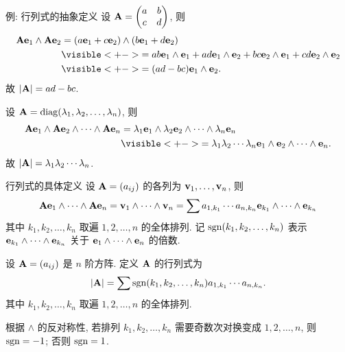 \begin{frame}{例: 行列式的抽象定义\noexer}
	\onslide<+->
	设 ${\mathbf{A}}=\begin{pmatrix}
		a&b\\c&d
	\end{pmatrix}$,
	\onslide<+->
	则
	\begin{align*}
		\bfA\bfe_1\wedge\bfA\bfe_2&=
		(a\bfe_1+c\bfe_2)\wedge(b\bfe_1+d\bfe_2)\\
		&\visible<+->{=ab\bfe_1\wedge\bfe_1+ad\bfe_1\wedge\bfe_2+bc\bfe_2\wedge\bfe_1+cd\bfe_2\wedge\bfe_2}\\
		&\visible<+->{=(ad-bc)\bfe_1\wedge\bfe_2.}
	\end{align*}
	\onslide<+->
	故 $|{\mathbf{A}}|=ad-bc$.

	\onslide<+->
	设 ${\mathbf{A}}={\mathrm{diag}}(\lambda_1,\lambda_2,\dots,\lambda_n)$,
	\onslide<+->
	则
	\begin{align*}
		\bfA\bfe_1\wedge\bfA\bfe_2\wedge\cdots\wedge\bfA\bfe_n
		&=\lambda_1\bfe_1\wedge\lambda_2\bfe_2\wedge \cdots\wedge\lambda_n\bfe_n\\
		&\visible<+->{=\lambda_1\lambda_2\cdots\lambda_n\bfe_1\wedge\bfe_2\wedge\cdots\wedge\bfe_n.}
	\end{align*}
	\onslide<+->
	故 $|{\mathbf{A}}|=\lambda_1\lambda_2\cdots\lambda_n$.
\end{frame}


\begin{frame}{行列式的具体定义\noexer}
	\onslide<+->
	设 ${\mathbf{A}}=(a_{ij})$ 的各列为 ${\mathbf{v}}_1,\dots,{\mathbf{v}}_n$,
	\onslide<+->
	则
	\[{\mathbf{A}}{\mathbf{e}}_1\wedge \dots\wedge {\mathbf{A}}{\mathbf{e}}_n={\mathbf{v}}_1\wedge\cdots\wedge{\mathbf{v}}_n=\sum a_{1,k_1}\cdots a_{n,k_n} {\mathbf{e}}_{k_1}\wedge \dots\wedge {\mathbf{e}}_{k_n}\]
	其中 $k_1,k_2,\dots,k_n$ 取遍 $1,2,\dots,n$ 的全体排列.
	\onslide<+->
	记 $\operatorname{sgn}(k_1,k_2,\dots,k_n)$ 表示 ${\mathbf{e}}_{k_1}\wedge \dots\wedge {\mathbf{e}}_{k_n}$ 关于 ${\mathbf{e}}_1\wedge \dots\wedge {\mathbf{e}}_n$ 的倍数.
	\onslide<+->
	\begin{definition}
		设 ${\mathbf{A}}=(a_{ij})$ 是 $n$ 阶方阵.
		定义 ${\mathbf{A}}$ 的行列式为
		\[|{\mathbf{A}}|=\sum \operatorname{sgn}(k_1,k_2,\dots,k_n)a_{1,k_1}\cdots a_{n,k_n}.\]
		其中 $k_1,k_2,\dots,k_n$ 取遍 $1,2,\dots,n$ 的全体排列.
	\end{definition}
	\onslide<+->
	根据 $\wedge$ 的反对称性, 若排列 $k_1,k_2,\dots,k_n$ 需要奇数次对换变成 $1,2,\dots,n$, 则 $\operatorname{sgn}=-1$; 否则 $\operatorname{sgn}=1$.
\end{frame}


